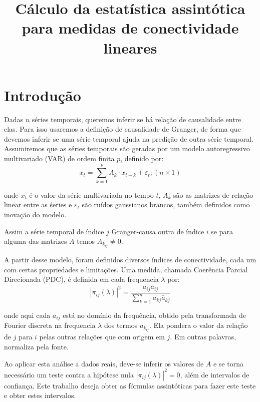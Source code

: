 \documentclass[a4paper,10pt]{article}
\title{Cálculo da estatística assintótica para medidas de conectividade lineares}
\author{}
\begin{document}
\maketitle

\begin{abstract}

\end{abstract}

\section{Introdução}

Dadas $n$ séries temporais, queremos inferir se há relação de causalidade entre elas. Para isso usaremos a definição de causalidade de Granger, de forma que devemos inferir se uma série temporal ajuda na predição de outra série temporal. Assumiremos que as séries temporais são geradas por um modelo autoregressivo multivariado (VAR) de ordem finita $p$, definido por:
\begin{equation}
x_{t} = \sum_{k=1}^{p}{A_{k}\cdot x_{t-k}} + \varepsilon_{t}; (n \times 1)
\end{equation}

onde $x_{t}$ é o valor da série multivariada no tempo $t$, $A_k$ são as matrizes de relação linear entre as śeries e $\varepsilon_{t}$ são ruídos gaussianos brancos, também definidos como inovação do modelo.

Assim a série temporal de índice $j$ Granger-causa outra de índice $i$ se para alguma das matrizes $A$ temos $A_{k_{ij}} \neq 0$. 

A partir desse modelo, foram definidos diversos índices de conectividade, cada um com certas propriedades e limitações. Uma medida, chamada Coerência Parcial Direcionada (PDC), é definida em cada frequencia $\lambda$ por:
\begin{equation}
|\pi_{ij}(\lambda)|^{2} = \frac{a_{ij} \bar{a}_{ij}}{\sum_{k=1}^{n}{a_{kj} \bar{a}_{kj}}}  
\end{equation}


onde aqui cada $a_{ij}$ está no domínio da frequência, obtido pela transformada de Fourier discreta na frequencia $\lambda$ dos termos $a_{k_{ij}}$. Ela pondera o valor da relação de $j$ para $i$ pelas outras relações que com origem em $j$. Em outras palavras, normaliza pela fonte.

Ao aplicar esta análise a dados reais, deve-se inferir os valores de $A$ e se torna necessário um teste contra a hipótese nula $ |\pi_{ij}(\lambda)|^{2} = 0$, além de intervalos de confiança. Este trabalho deseja obter as fórmulas assintóticas para fazer este teste e obter estes intervalos.
\end{document}
